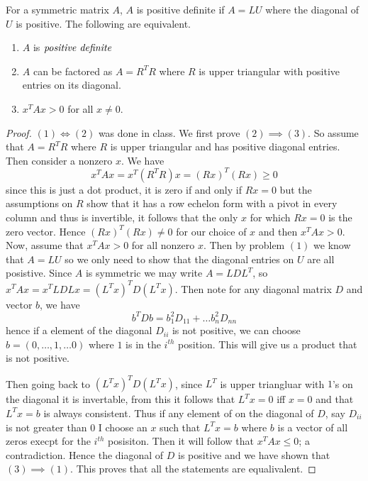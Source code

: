 \newpage
\question
For a symmetric matrix $A$, $A$ is positive definite if $A = LU$ where the diagonal of $U$ is positive. 
The following are equivalent. 
\begin{enumerate}
    \item $A$ is $\emph{positive definite}$
    \item $A$ can be factored as $A = R^TR$ where $R$ is upper triangular with positive entries on its diagonal. 
    \item $x^TAx > 0$ for all $x \neq 0$.
    
\end{enumerate}

\begin{proof}
    $(1) \iff (2)$ was done in class. 
    We first prove $(2) \implies (3)$. So assume that $A = R^TR$ where $R$ is upper triangular and has positive diagonal entries. 
    Then consider a nonzero $x$. We have 
    \[x^TAx = x^T (R^TR) x = (Rx)^T(Rx) \geq 0\]
    since this is just a dot product, it is zero if and only if $Rx = 0$ but the assumptions on $R$ show that it has a row echelon form  with a pivot in every column and 
    thus is invertible, it follows that the only $x$ for which $Rx = 0$ is the zero vector. Hence $(Rx)^T(Rx) \neq 0$ for our choice of $x$ and then 
    $x^TAx > 0$. Now, assume that $x^TAx > 0$ for all nonzero $x$. Then by problem $(1)$ we know that $A = LU$ so we only need to show that the diagonal entries on $U$ are all posistive. 
    Since $A$ is symmetric we may write $A = LDL^T$, so $x^TAx = x^TL D Lx = (L^Tx)^T D (L^Tx)$. Then note for any diagonal matrix $D$ and vector $b$, we have 
    \[b^TDb = b_1^2 D_{11} + \dots b_n^2 D_{nn}\]
    hence if a element of the diagonal $D_{ii} $ is not positive, we can choose $b = (0, \dots, 1, \dots 0)$ where $1$ is in the $i^{th}$ position. This will give us a product that is not positive. 


    Then going back to  $ (L^Tx)^T D (L^Tx)$, since $L^T$ is upper triangluar with $1$'s on the diagonal it is invertable, from this it follows that $L^Tx = 0$ iff $x = 0$ and that $L^Tx = b$ is always consistent. Thus if any element of on the diagonal 
    of $D$, say $D_{ii}$ is not greater than 
    $0$ I choose an $x$ such that $L^Tx = b$ where $b$ is a vector of all zeros execpt for the $i^{th}$ posisiton. Then it will follow that $x^TAx \leq 0$; a contradiction. Hence the diagonal of $D$ is positive 
    and we have shown that $(3) \implies (1)$. This proves that all the statements are equalivalent. 

\end{proof}


